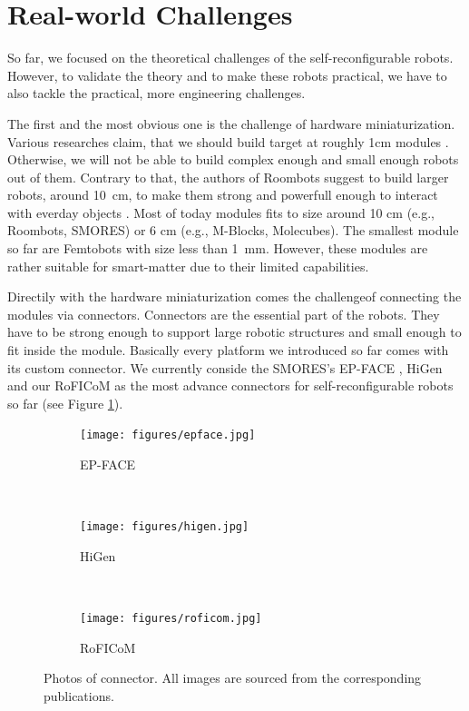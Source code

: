 \section{Real-world Challenges}\label{sec:mixed-challenges}

So far, we focused on the theoretical challenges of the self-reconfigurable
robots. However, to validate the theory and to make these robots practical, we
have to also tackle the practical, more engineering challenges.

The first and the most obvious one is the challenge of hardware miniaturization.
Various researches claim, that we should build target at roughly 1cm modules
\cite{1285597, DBLP:conf/ieeealife/Christensen07}. Otherwise, we will not be
able to build complex enough and small enough robots out of them. Contrary to
that, the authors of Roombots suggest to build larger robots, around 10~cm, to
make them strong and powerfull enough to interact with everday objects
\cite{DBLP:conf/icra/SprowitzBDI09}. Most of today modules fits to size around
10 cm (e.g., Roombots, SMORES) or 6 cm (e.g., M-Blocks, Molecubes). The smallest
module so far are Femtobots \cite{Femtobots} with size less than 1~mm. However,
these modules are rather suitable for smart-matter due to their limited
capabilities.

Directily with the hardware miniaturization comes the challengeof connecting the
modules via connectors. Connectors are the essential part of the robots. They
have to be strong enough to support large robotic structures and small enough to
fit inside the module. Basically every platform we introduced so far comes with
its custom connector. We currently conside the SMORES's EP-FACE
\cite{DBLP:conf/iros/TosunDLY16}, HiGen \cite{DBLP:conf/iros/ParrottDG14} and
our RoFICoM \cite{DBLP:conf/iros/MrazekB19} as the most advance connectors for
self-reconfigurable robots so far (see Figure \ref{fig:connectors}).

\begin{figure}[!t]
    \centering
    \begin{subfigure}[b]{0.315\textwidth}
        \centering
        \texttt{[image: figures/epface.jpg]}
        \caption{EP-FACE}
    \end{subfigure}
    ~
    \begin{subfigure}[b]{0.315\textwidth}
        \centering
        \texttt{[image: figures/higen.jpg]}
        \caption{HiGen}
    \end{subfigure}
    ~
    \begin{subfigure}[b]{0.315\textwidth}
        \centering
        \texttt{[image: figures/roficom.jpg]}
        \caption{RoFICoM}
    \end{subfigure}

    \caption{Photos of connector. All images are sourced from the corresponding publications.}
    \label{fig:connectors}
\end{figure}

